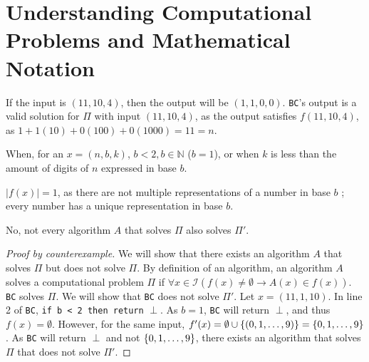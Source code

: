 \documentclass[11pt]{scrartcl}
\theoremstyle{dotlessP}
\theoremstyle{dotlessN}
\DeclarePairedDelimiter\set{\{}{\}}
\newcommand{\unite}{\cup}
\newcommand{\nats}{\mathbb{N}}
\begin{document}
\section{Understanding Computational Problems and Mathematical Notation}
\begin{ans}
	If the input is $(11,10,4)$, then the output will be  $(1,1,0,0)$. \texttt{BC}'s output is a valid solution for $\Pi$ with input $(11,10,4)$, as the output satisfies $f(11,10,4)$, as $1 + 1(10) + 0(100) + 0(1000) = 11 = n$.
\end{ans}
\begin{ans}

\end{ans}
\begin{ans}
	When, for an $x = (n,b,k)$, $b < 2, b \in \nats$ ($b = 1$), or when $k$ is less than the amount of digits of $n$ expressed in base $b$.
\end{ans} 
\begin{ans}
	$|f(x)| = 1$, as there are not multiple representations of a number in base  $b$ ; every number has a unique representation in base $b$.
\end{ans}
\begin{ans}
	No, not every algorithm $A$ that solves $\Pi$ also solves $\Pi'$.
	\begin{proof}
		[Proof by counterexample]
		We will show that there exists an algorithm $A$ that solves $\Pi$ but does not solve $\Pi$. By definition of an algorithm, an algorithm $A$ solves a computational problem $\Pi$ if $\forall x \in \mathcal{I} (f(x) \neq \emptyset \to A(x) \in f(x))$. \texttt{BC} solves $\Pi$. We will show that \texttt{BC} does not solve $\Pi'$. Let $x = (11,1, 10)$. In line 2 of \texttt{BC}, \texttt{if b < 2 then return} $\perp$. As  $b = 1$, \texttt{BC} will return $\perp$, and thus $f(x) = \emptyset$. However, for the same input, $f'(x) = \emptyset \unite \set*{(0,1,\dots,9)} = \set*{0,1,\dots,9}$. As \texttt{BC} will return $\perp$ and not $\set*{0,1,\dots,9}$, there exists an algorithm that solves $\Pi$ that does not solve $\Pi'$.
	\end{proof}
\end{ans}
\end{document}
